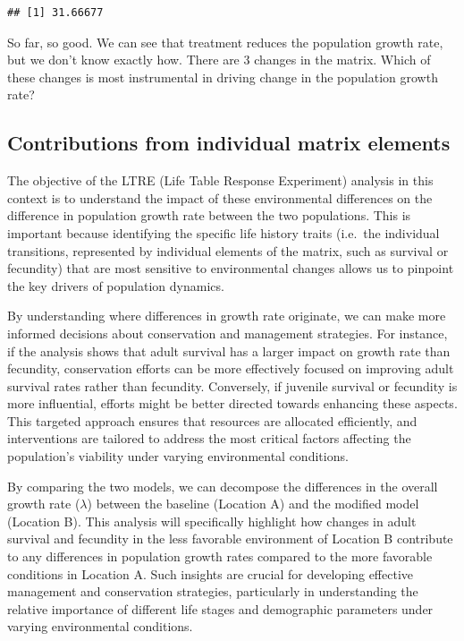 \documentclass[
  a4paper]{book}
\begin{document}
\begin{verbatim}
## [1] 31.66677
\end{verbatim}

So far, so good. We can see that treatment reduces the population growth rate, but we don't know exactly how. There are 3 changes in the matrix. Which of these changes is most instrumental in driving change in the population growth rate?

\subsection{Contributions from individual matrix elements}\label{contributions-from-individual-matrix-elements}

The objective of the LTRE (Life Table Response Experiment) analysis in this context is to understand the impact of these environmental differences on the difference in population growth rate between the two populations. This is important because identifying the specific life history traits (i.e.~the individual transitions, represented by individual elements of the matrix, such as survival or fecundity) that are most sensitive to environmental changes allows us to pinpoint the key drivers of population dynamics.

By understanding where differences in growth rate originate, we can make more informed decisions about conservation and management strategies. For instance, if the analysis shows that adult survival has a larger impact on growth rate than fecundity, conservation efforts can be more effectively focused on improving adult survival rates rather than fecundity. Conversely, if juvenile survival or fecundity is more influential, efforts might be better directed towards enhancing these aspects. This targeted approach ensures that resources are allocated efficiently, and interventions are tailored to address the most critical factors affecting the population's viability under varying environmental conditions.

By comparing the two models, we can decompose the differences in the overall growth rate (\(\lambda\)) between the baseline (Location A) and the modified model (Location B). This analysis will specifically highlight how changes in adult survival and fecundity in the less favorable environment of Location B contribute to any differences in population growth rates compared to the more favorable conditions in Location A. Such insights are crucial for developing effective management and conservation strategies, particularly in understanding the relative importance of different life stages and demographic parameters under varying environmental conditions.
\end{document}
